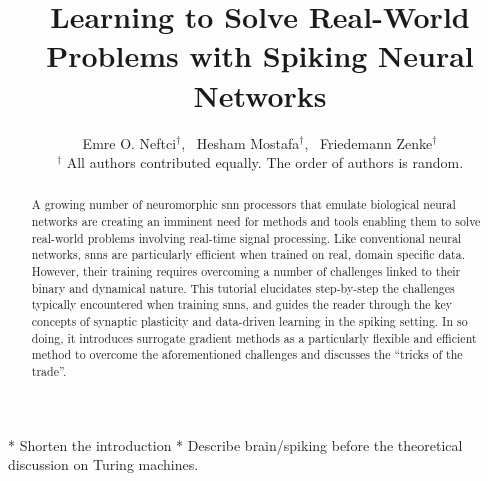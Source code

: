 \documentclass[journal,onecolumn,11pt]{IEEEtran}
\begin{document}
\title{Learning to Solve Real-World Problems with Spiking Neural Networks}

\author{Emre O. Neftci$^\dagger$,~
        Hesham Mostafa$^\dagger$,~
        Friedemann Zenke$^\dagger$\\
        {\small $^\dagger$ All authors contributed equally. The order of authors is random.}}%
%
{}
%
\maketitle
\IEEEpeerreviewmaketitle
%
\begin{abstract}
A growing number of neuromorphic \gls{snn} processors that emulate biological neural networks are creating an imminent need for methods and tools enabling them to solve real-world problems involving real-time signal processing.
Like conventional neural networks, \glspl{snn} are particularly efficient when trained on real, domain specific data. 
However, their training requires overcoming a number of challenges linked to their binary and dynamical nature.
This tutorial elucidates step-by-step the challenges typically encountered when training \glspl{snn}, and guides the reader through the key concepts of synaptic plasticity and data-driven learning in the spiking setting.
In so doing, it introduces surrogate gradient methods as a particularly flexible and efficient method to overcome the aforementioned challenges and discusses the ``tricks of the trade''. 
\end{abstract}


\tableofcontents
\newpage


\begin{center}
  * Shorten the introduction
  * Describe brain/spiking before the theoretical discussion on Turing machines.
\end{center}
\end{document}
